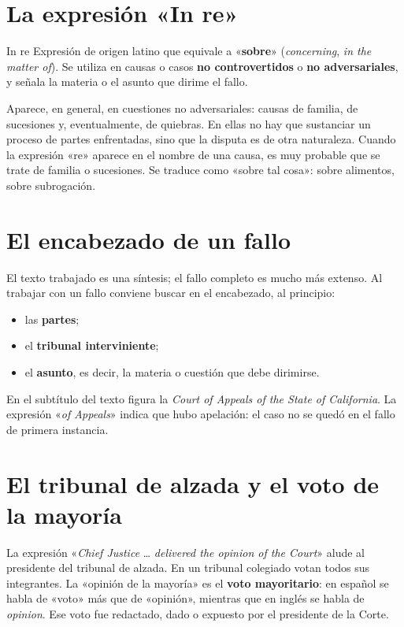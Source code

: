 \documentclass[12pt,oneside]{book}
\begin{document}
\section{La expresión «In re»}

\begin{definition}{In re}
Expresión de origen latino que equivale a «\textbf{sobre}» (\textit{concerning}, \textit{in the matter of}). Se utiliza en causas o casos \textbf{no controvertidos} o \textbf{no adversariales}, y señala la materia o el asunto que dirime el fallo.
\end{definition}

Aparece, en general, en cuestiones no adversariales: causas de familia, de sucesiones y, eventualmente, de quiebras. En ellas no hay que sustanciar un proceso de partes enfrentadas, sino que la disputa es de otra naturaleza. Cuando la expresión «re» aparece en el nombre de una causa, es muy probable que se trate de familia o sucesiones. Se traduce como «sobre tal cosa»: sobre alimentos, sobre subrogación.

\section{El encabezado de un fallo}

El texto trabajado es una síntesis; el fallo completo es mucho más extenso. Al trabajar con un fallo conviene buscar en el encabezado, al principio:

\begin{itemize}
    \item las \textbf{partes};
    \item el \textbf{tribunal interviniente};
    \item el \textbf{asunto}, es decir, la materia o cuestión que debe dirimirse.
\end{itemize}

En el subtítulo del texto figura la \textit{Court of Appeals of the State of California}. La expresión «\textit{of Appeals}» indica que hubo apelación: el caso no se quedó en el fallo de primera instancia.

\section{El tribunal de alzada y el voto de la mayoría}

La expresión «\textit{Chief Justice} \ldots{} \textit{delivered the opinion of the Court}» alude al presidente del tribunal de alzada. En un tribunal colegiado votan todos sus integrantes. La «opinión de la mayoría» es el \textbf{voto mayoritario}: en español se habla de «voto» más que de «opinión», mientras que en inglés se habla de \textit{opinion}. Ese voto fue redactado, dado o expuesto por el presidente de la Corte.
\end{document}

